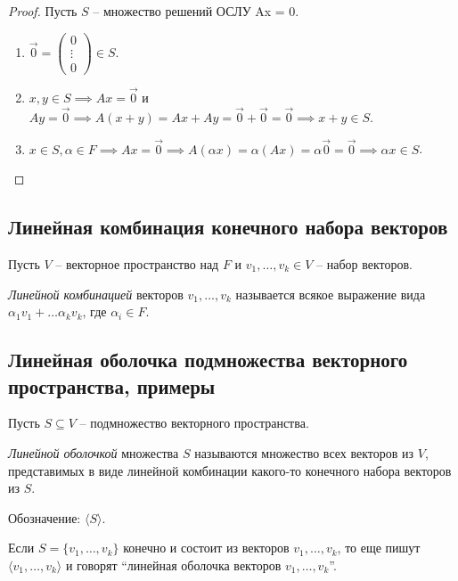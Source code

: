 \begin{proof}
    Пусть $S$ -- множество решений ОСЛУ Ax = 0.
    \begin{enumerate}
        \item $\overrightarrow{0} = \begin{pmatrix} 0 \\ \vdots \\ 0 \end{pmatrix} \in S$.
        \item $x, y \in S \implies Ax = \overrightarrow{0}$ и $Ay = \overrightarrow{0} \implies A(x + y) = Ax + Ay = \overrightarrow{0} + \overrightarrow{0} = \overrightarrow{0} \implies x + y \in S$.
        \item $x \in S, \alpha \in F \implies Ax = \overrightarrow{0} \implies A(\alpha x) = \alpha (Ax) = \alpha \overrightarrow{0} = \overrightarrow{0} \implies \alpha x \in S$. \qedhere
    \end{enumerate}
\end{proof}


\subsection{Линейная комбинация конечного набора векторов}

Пусть $V$ -- векторное пространство над $F$ и $v_1, \dots, v_k \in V$ -- набор векторов.

\begin{definition}
    \textit{Линейной комбинацией} векторов $v_1, \dots, v_k$ называется всякое выражение вида $\alpha_1 v_1 + \dots \alpha_k v_k$, где $\alpha_i \in F$.
\end{definition}

\subsection{Линейная оболочка подмножества векторного пространства, примеры}

Пусть $S \subseteq V$ -- подмножество векторного пространства.

\begin{definition}
    \textit{Линейной оболочкой} множества $S$ называются множество всех векторов из $V$, представимых в виде линейной комбинации какого-то конечного набора векторов из $S$.

    Обозначение: $\langle S \rangle$.
\end{definition}

Если $S = \{v_1, \dots, v_k\}$ конечно и состоит из векторов $v_1, \dots, v_k$, то еще пишут $\langle v_1, \dots, v_k \rangle$ и говорят ``линейная оболочка векторов $v_1, \dots, v_k$''.

